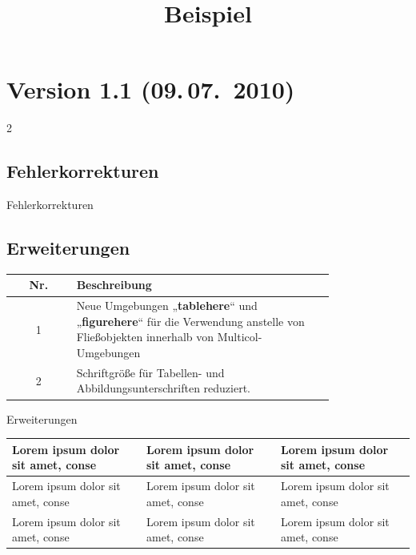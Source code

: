 \documentclass[a0paper,noDIN,MathematikA0]{tudmathposter}
\begin{document}
\section{Version 1.1 (09.\,07.~2010)}
\begin{multicols}2
  \subsection{Fehlerkorrekturen}
 \begin{figurehere}
    \centerline{%
    }
    \caption{Fehlerkorrekturen}
  \end{figurehere}
  \subsection{Erweiterungen}
  \begin{tablehere}
    \centering
    \begin{farbtabellen}
      \begin{tabular}{||c|p{0.8\linewidth}||}
        \hline\hline
        Nr.&Beschreibung\\\hline\hline
        1&Neue Umgebungen „\textbf{tablehere}“ und „\textbf{figurehere}“ für die Verwendung
        anstelle von Fließobjekten innerhalb von Multicol-Umgebungen\\\hline
        2&Schriftgröße für Tabellen- und Abbildungsunterschriften reduziert.\\\hline
      \end{tabular}
    \end{farbtabellen}
    \caption{Erweiterungen}
  \end{tablehere}
\end{multicols}
\label{Updende}
\clearpage
{}%
\title{Beispiel}%
\maketitle
{}

\begin{farbtabellen}
\begin{tabularx}{\linewidth}{|X|X|X|}
\hline
Lorem ipsum dolor sit amet, conse&
Lorem ipsum dolor sit amet, conse&
Lorem ipsum dolor sit amet, conse\\\hline
Lorem ipsum dolor sit amet, conse&
Lorem ipsum dolor sit amet, conse&
Lorem ipsum dolor sit amet, conse\\\hline
Lorem ipsum dolor sit amet, conse&
Lorem ipsum dolor sit amet, conse&
Lorem ipsum dolor sit amet, conse\\\hline
\end{tabularx}
\end{farbtabellen}
\end{document}
